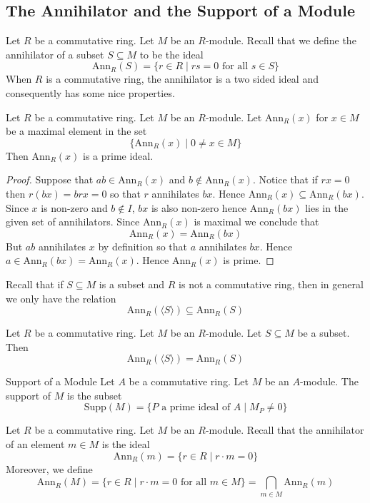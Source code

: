 \documentclass[a4paper]{article}
\begin{document}
\subsection{The Annihilator and the Support of a Module}
Let $R$ be a commutative ring. Let $M$ be an $R$-module. Recall that we define the annihilator of a subset $S\subseteq M$ to be the ideal $$\text{Ann}_R(S)=\{r\in R\;|\;rs=0\text{ for all }s\in S\}$$ When $R$ is a commutative ring, the annihilator is a two sided ideal and consequently has some nice properties. 

\begin{prp}{}{} Let $R$ be a commutative ring. Let $M$ be an $R$-module. Let $\text{Ann}_R(x)$ for $x\in M$ be a maximal element in the set $$\{\text{Ann}_R(x)\;|\;0\neq x\in M\}$$ Then $\text{Ann}_R(x)$ is a prime ideal. \tcbline
\begin{proof}
Suppose that $ab\in\text{Ann}_R(x)$ and $b\notin\text{Ann}_R(x)$. Notice that if $rx=0$ then $r(bx)=brx=0$ so that $r$ annihilates $bx$. Hence $\text{Ann}_R(x)\subseteq\text{Ann}_R(bx)$. Since $x$ is non-zero and $b\notin I$, $bx$ is also non-zero hence $\text{Ann}_R(bx)$ lies in the given set of annihilators. Since $\text{Ann}_R(x)$ is maximal we conclude that $$\text{Ann}_R(x)=\text{Ann}_R(bx)$$ But $ab$ annihilates $x$ by definition so that $a$ annihilates $bx$. Hence $a\in\text{Ann}_R(bx)=\text{Ann}_R(x)$. Hence $\text{Ann}_R(x)$ is prime. 
\end{proof}
\end{prp}

Recall that if $S\subseteq M$ is a subset and $R$ is not a commutative ring, then in general we only have the relation $$\text{Ann}_R(\langle S\rangle)\subseteq\text{Ann}_R(S)$$

\begin{prp}{}{} Let $R$ be a commutative ring. Let $M$ be an $R$-module. Let $S\subseteq M$ be a subset. Then $$\text{Ann}_R(\langle S\rangle)=\text{Ann}_R(S)$$
\end{prp}

\begin{defn}{Support of a Module}{} Let $A$ be a commutative ring. Let $M$ be an $A$-module. The support of $M$ is the subset $$\text{Supp}(M)=\{P\text{ a prime ideal of }A\;|\;M_P\neq 0\}$$
\end{defn}

Let $R$ be a commutative ring. Let $M$ be an $R$-module. Recall that the annihilator of an element $m\in M$ is the ideal $$\text{Ann}_R(m)=\{r\in R\;|\;r\cdot m=0\}$$ Moreover, we define $$\text{Ann}_R(M)=\{r\in R\;|\;r\cdot m=0\text{ for all }m\in M\}=\bigcap_{m\in M}\text{Ann}_R(m)$$
\end{document}
